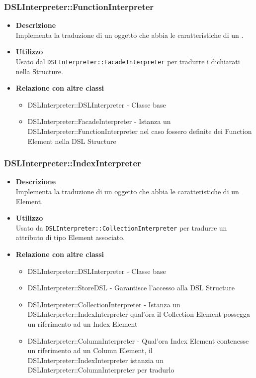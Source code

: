 \subsubsection{DSLInterpreter::FunctionInterpreter}
\begin{itemize}
\item \textbf{Descrizione} \hfill \\
  Implementa la traduzione di un oggetto che abbia le caratteristiche di un .
\item \textbf{Utilizzo} \hfill \\
  Usato dal \texttt{DSLInterpreter::FacadeInterpreter} per tradurre i  dichiarati nella  Structure.
\item \textbf{Relazione con altre classi}
  \begin{itemize}
  \item DSLInterpreter::DSLInterpreter - Classe base
  \item DSLInterpreter::FacadeInterpreter - Istanza un DSLInterpreter::FunctionInterpreter nel caso fossero definite dei Function Element nella DSL Structure
  \end{itemize}
\end{itemize}

\subsubsection{DSLInterpreter::IndexInterpreter}
\begin{itemize}
\item \textbf{Descrizione} \hfill \\
  Implementa la traduzione di un oggetto che abbia le caratteristiche di un  Element.
\item \textbf{Utilizzo} \hfill \\
  Usato da \texttt{DSLInterpreter::CollectionInterpreter} per tradurre un attributo di tipo  Element associato.
\item \textbf{Relazione con altre classi}
  \begin{itemize}
  \item DSLInterpreter::DSLInterpreter - Classe base
  \item DSLInterpreter::StoreDSL - Garantisce l'accesso alla DSL Structure
  \item DSLInterpreter::CollectionInterpreter - Istanza un DSLInterpreter::IndexInterpreter qual'ora il Collection Element possegga un riferimento ad un Index Element
  \item DSLInterpreter::ColumnInterpreter - Qual'ora Index Element contenesse un riferimento ad un Column Element, il DSLInterpreter::IndexInterpreter istanzia un DSLInterpreter::ColumnInterpreter per tradurlo
  \end{itemize}
\end{itemize}

